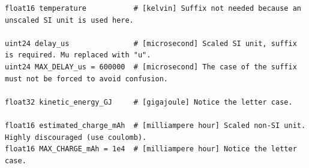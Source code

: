 \begin{remark}
\begin{verbatim}
float16 temperature           # [kelvin] Suffix not needed because an unscaled SI unit is used here.

uint24 delay_us               # [microsecond] Scaled SI unit, suffix is required. Mu replaced with "u".
uint24 MAX_DELAY_us = 600000  # [microsecond] The case of the suffix must not be forced to avoid confusion.

float32 kinetic_energy_GJ     # [gigajoule] Notice the letter case.

float16 estimated_charge_mAh  # [milliampere hour] Scaled non-SI unit. Highly discouraged (use coulomb).
float16 MAX_CHARGE_mAh = 1e4  # [milliampere hour] Notice the letter case.
\end{verbatim}
\end{remark}
